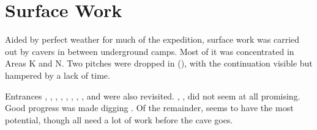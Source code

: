 \section{Surface Work}

Aided by perfect weather for much of the expedition, surface work was
carried out by cavers in between underground camps. Most of it was
concentrated in Areas K and N. Two pitches were dropped in  (),
with the continuation visible but hampered by a lack of time.

Entrances , , , , , , , , and  were also
revisited. , ,  did not seem at all promising. Good progress
was made digging . Of the remainder,  seems to have the most
potential, though all need a lot of work before the cave goes.

